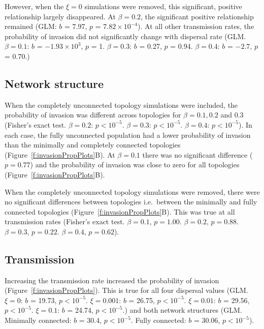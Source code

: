 However, when the $\xi = 0$ simulations were removed, this significant, positive relationship largely disappeared.
At $\beta = 0.2$, the significant positive relationship remained (GLM: $b$ = 7.97, $p$ = \ensuremath{7.82\times 10^{-4}}).
At all other transmission rates, the probability of invasion did not significantly change with dispersal rate (GLM. $\beta = 0.1$: $b$ = \ensuremath{-1.93\times 10^{3}}, $p$ = 1. $\beta = 0.3$: $b$ = 0.27, $p$ = 0.94. $\beta = 0.4$: $b$ = \ensuremath{-2.7}, $p$ = 0.70.)


\subsection{Network structure}

When the completely unconnected topology simulations were included, the probability of invasion was different across topologies for $\beta = 0.1, 0.2$ and $0.3$ (Fisher's exact test. $\beta = 0.2$:  $p < 10^{-5}$. $\beta = 0.3$: $p < 10^{-5}$. $\beta = 0.4$:  $p < 10^{-5}$).
In each case, the fully unconnected population had a lower probability of invasion than the minimally and completely connected topologies (Figure~\ref{f:invasionPropPlots}B).
At $\beta = 0.1$ there was no significant difference ($p = 0.77$) and the probability of invasion was close to zero for all topologies (Figure~\ref{f:invasionPropPlots}B).

When the completely unconnected topology simulations were removed, there were no significant differences between topologies i.e.\ between the minimally and fully connected topologies (Figure~\ref{f:invasionPropPlots}B). 
This was true at all transmission rates (Fisher's exact test. $\beta = 0.1$, $p = 1.00$. $\beta = 0.2$,  $p = 0.88$. $\beta = 0.3$, $p = 0.22$. $\beta = 0.4$,  $p = 0.62$).



\subsection{Transmission}

Increasing the transmission rate increased the probability of invasion (Figure~\ref{f:invasionPropPlots}).
This is true for all four dispersal values (GLM. $\xi = 0$: $b$ = 19.73, $p < 10^{-5}$. $\xi = 0.001$: $b$ = 26.75, $p < 10^{-5}$. $\xi = 0.01$: $b$ = 29.56, $p < 10^{-5}$. $\xi = 0.1$: $b$ = 24.74, $p < 10^{-5}$.) and both network structures (GLM. Minimally connected: $b$ = 30.4, $p < 10^{-5}$. Fully connected: $b$ = 30.06, $p < 10^{-5}$).








